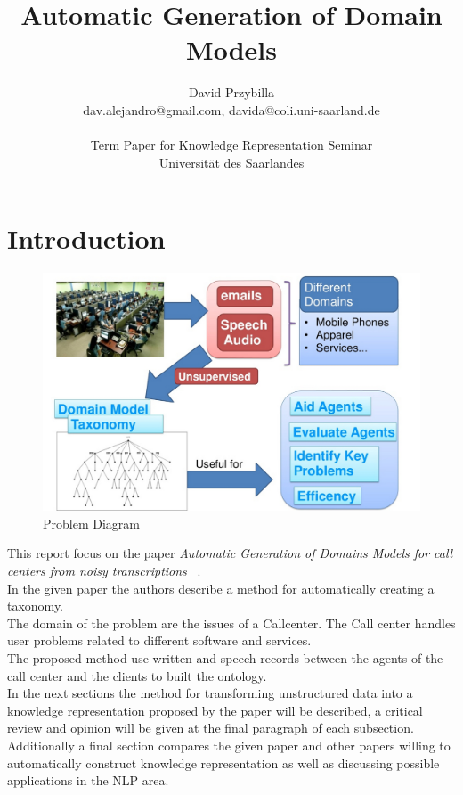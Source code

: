 \documentclass[4pt,a4paper,twocolumn]{article}
\author{David Przybilla\\dav.alejandro@gmail.com, davida@coli.uni-saarland.de\\ \\ Term Paper for Knowledge Representation Seminar\\ Universit\"{a}t des Saarlandes}
\title{Automatic Generation of Domain Models}
\begin{document}
\twocolumn[
	 \begin{@twocolumnfalse}
    \maketitle
  \end{@twocolumnfalse}
 ]




\section{Introduction}


\begin{figure}[]
  \centering
    \includegraphics[scale=0.2]{pics/problem.jpg}
    \caption{Problem Diagram}
   \label{fig:problem}  
\end{figure}



This report focus on the paper \textit{Automatic Generation of Domains Models for call centers from noisy transcriptions} ~\cite{Roy:2006:AGD:1220175.1220268}.\\
In the given paper the authors describe a method for automatically creating a taxonomy.\\
The domain of the problem are the issues of a Callcenter. The Call center handles user problems related to different software and services.\\
The proposed method use  written and speech records between the agents of the call center and the clients to built the ontology. \\
In the next sections  the method for transforming unstructured data into a knowledge representation proposed by the paper will be described, a critical review and opinion will be given at the final paragraph of each subsection. Additionally a final section compares the given paper and other papers willing to automatically construct knowledge representation as well as discussing possible applications in the NLP area.
\end{document}
